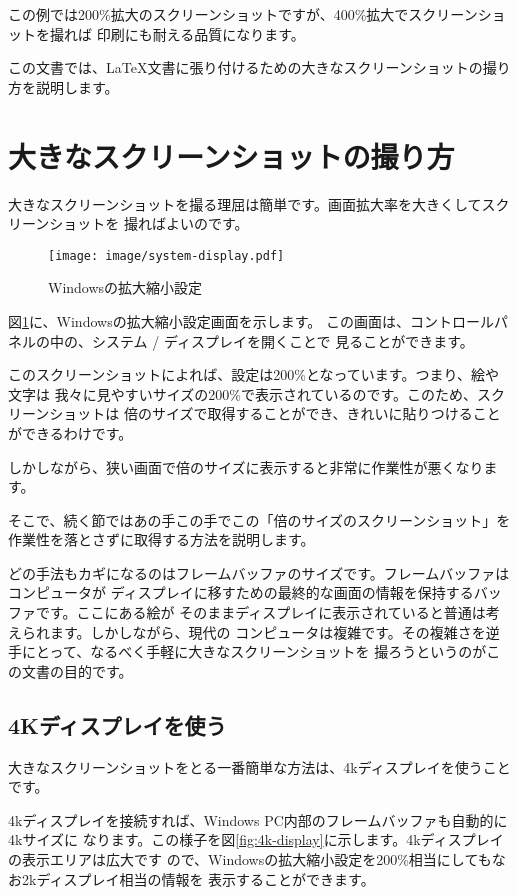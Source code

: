 この例では200\%拡大のスクリーンショットですが、400\%拡大でスクリーンショットを撮れば
印刷にも耐える品質になります。

この文書では、\LaTeX 文書に張り付けるための大きなスクリーンショットの撮り方を説明します。

\section{大きなスクリーンショットの撮り方}
大きなスクリーンショットを撮る理屈は簡単です。画面拡大率を大きくしてスクリーンショットを
撮ればよいのです。

\begin{figure}[btp]
  \begin{center}
    \texttt{[image: image/system-display.pdf]}
    \caption{Windowsの拡大縮小設定} \label{fig:system-display}
  \end{center}
\end{figure}

図\ref{fig:system-display}に、Windowsの拡大縮小設定画面を示します。
この画面は、コントロールパネルの中の、システム / ディスプレイを開くことで
見ることができます。

このスクリーンショットによれば、設定は200\%となっています。つまり、絵や文字は
我々に見やすいサイズの200\%で表示されているのです。このため、スクリーンショットは
倍のサイズで取得することができ、きれいに貼りつけることができるわけです。

しかしながら、狭い画面で倍のサイズに表示すると非常に作業性が悪くなります。

そこで、続く節ではあの手この手でこの「倍のサイズのスクリーンショット」を
作業性を落とさずに取得する方法を説明します。

どの手法もカギになるのはフレームバッファのサイズです。フレームバッファはコンピュータが
ディスプレイに移すための最終的な画面の情報を保持するバッファです。ここにある絵が
そのままディスプレイに表示されていると普通は考えられます。しかしながら、現代の
コンピュータは複雑です。その複雑さを逆手にとって、なるべく手軽に大きなスクリーンショットを
撮ろうというのがこの文書の目的です。

\subsection{4Kディスプレイを使う}
大きなスクリーンショットをとる一番簡単な方法は、4kディスプレイを使うことです。

4kディスプレイを接続すれば、Windows PC内部のフレームバッファも自動的に4kサイズに
なります。この様子を図\ref{fig:4k-display}に示します。4kディスプレイの表示エリアは広大です
ので、Windowsの拡大縮小設定を200\%相当にしてもなお2kディスプレイ相当の情報を
表示することができます。

